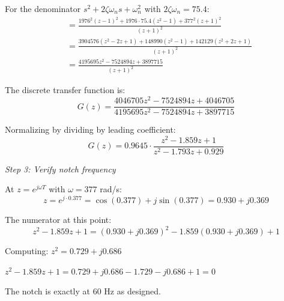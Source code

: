 \begin{example}
For the denominator $s^2 + 2\zeta\omega_n s + \omega_n^2$ with $2\zeta\omega_n = 75.4$:
\begin{align}
&= \frac{1976^2(z-1)^2 + 1976 \cdot 75.4(z^2-1) + 377^2(z+1)^2}{(z+1)^2} \\
&= \frac{3904576(z^2 - 2z + 1) + 148990(z^2-1) + 142129(z^2 + 2z + 1)}{(z+1)^2} \\
&= \frac{4195695z^2 - 7524894z + 3897715}{(z+1)^2}
\end{align}

The discrete transfer function is:
\begin{equation}
G(z) = \frac{4046705z^2 - 7524894z + 4046705}{4195695z^2 - 7524894z + 3897715}
\end{equation}

Normalizing by dividing by leading coefficient:
\begin{equation}
G(z) = 0.9645 \cdot \frac{z^2 - 1.859z + 1}{z^2 - 1.793z + 0.929}
\end{equation}

\textit{Step 3: Verify notch frequency}

At $z = e^{j\omega T}$ with $\omega = 377$ rad/s:
\begin{equation}
z = e^{j \cdot 0.377} = \cos(0.377) + j\sin(0.377) = 0.930 + j0.369
\end{equation}

The numerator at this point:
\begin{equation}
z^2 - 1.859z + 1 = (0.930 + j0.369)^2 - 1.859(0.930 + j0.369) + 1
\end{equation}

Computing: $z^2 = 0.729 + j0.686$

$z^2 - 1.859z + 1 = 0.729 + j0.686 - 1.729 - j0.686 + 1 = 0$

The notch is exactly at 60 Hz as designed.
\end{example}

